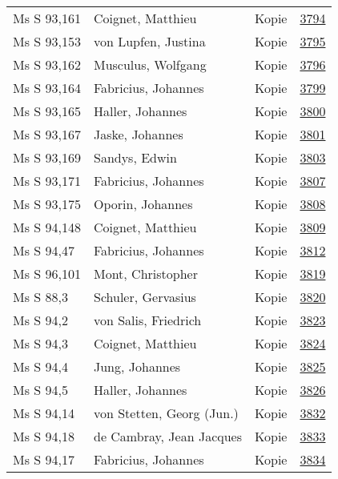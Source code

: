 \documentclass[10pt,a4paper,landscape]{report}
\begin{document}
\begin{longtable}{p{16cm}p{4cm}lr}
Ms S 93,161	&	Coignet, Matthieu	&	Kopie	&	\href{http://130.60.24.72/assignment/3794}{3794}\\
Ms S 93,153	&	von Lupfen, Justina	&	Kopie	&	\href{http://130.60.24.72/assignment/3795}{3795}\\
Ms S 93,162	&	Musculus, Wolfgang	&	Kopie	&	\href{http://130.60.24.72/assignment/3796}{3796}\\
Ms S 93,164	&	Fabricius, Johannes	&	Kopie	&	\href{http://130.60.24.72/assignment/3799}{3799}\\
Ms S 93,165	&	Haller, Johannes	&	Kopie	&	\href{http://130.60.24.72/assignment/3800}{3800}\\
Ms S 93,167	&	Jaske, Johannes	&	Kopie	&	\href{http://130.60.24.72/assignment/3801}{3801}\\
Ms S 93,169	&	Sandys, Edwin	&	Kopie	&	\href{http://130.60.24.72/assignment/3803}{3803}\\
Ms S 93,171	&	Fabricius, Johannes	&	Kopie	&	\href{http://130.60.24.72/assignment/3807}{3807}\\
Ms S 93,175	&	Oporin, Johannes	&	Kopie	&	\href{http://130.60.24.72/assignment/3808}{3808}\\
Ms S 94,148	&	Coignet, Matthieu	&	Kopie	&	\href{http://130.60.24.72/assignment/3809}{3809}\\
Ms S 94,47	&	Fabricius, Johannes	&	Kopie	&	\href{http://130.60.24.72/assignment/3812}{3812}\\
Ms S 96,101	&	Mont, Christopher	&	Kopie	&	\href{http://130.60.24.72/assignment/3819}{3819}\\
Ms S 88,3	&	Schuler, Gervasius	&	Kopie	&	\href{http://130.60.24.72/assignment/3820}{3820}\\
Ms S 94,2	&	von Salis, Friedrich	&	Kopie	&	\href{http://130.60.24.72/assignment/3823}{3823}\\
Ms S 94,3	&	Coignet, Matthieu	&	Kopie	&	\href{http://130.60.24.72/assignment/3824}{3824}\\
Ms S 94,4	&	Jung, Johannes	&	Kopie	&	\href{http://130.60.24.72/assignment/3825}{3825}\\
Ms S 94,5	&	Haller, Johannes	&	Kopie	&	\href{http://130.60.24.72/assignment/3826}{3826}\\
Ms S 94,14	&	von Stetten, Georg (Jun.)	&	Kopie	&	\href{http://130.60.24.72/assignment/3832}{3832}\\
Ms S 94,18	&	de Cambray, Jean Jacques	&	Kopie	&	\href{http://130.60.24.72/assignment/3833}{3833}\\
Ms S 94,17	&	Fabricius, Johannes	&	Kopie	&	\href{http://130.60.24.72/assignment/3834}{3834}\\

\end{longtable}
\end{document}
